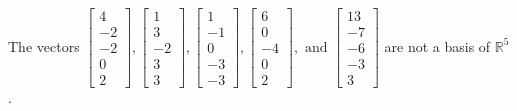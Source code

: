 \begin{exercise}
\begin{exerciseStatement}
  \end{exerciseStatement}
  \begin{exerciseAnswer}
   The vectors \(\left[\begin{array}{r}
4 \\
-2 \\
-2 \\
0 \\
2
\end{array}\right] , \left[\begin{array}{r}
1 \\
3 \\
-2 \\
3 \\
3
\end{array}\right] , \left[\begin{array}{r}
1 \\
-1 \\
0 \\
-3 \\
-3
\end{array}\right] , \left[\begin{array}{r}
6 \\
0 \\
-4 \\
0 \\
2
\end{array}\right] , \text{ and } \left[\begin{array}{r}
13 \\
-7 \\
-6 \\
-3 \\
3
\end{array}\right]\) 
  	 are not  a basis of \(\mathbb{R}^5\).
  


  \end{exerciseAnswer}
\end{exercise}